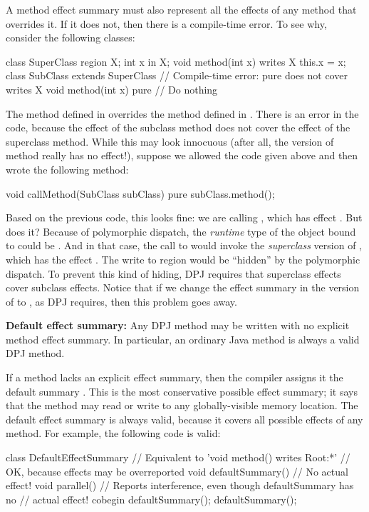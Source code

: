 A method effect summary must also represent all the effects of any
method that overrides it.  If it does not, then there is a
compile-time error.  To see why, consider the following classes:
%
\begin{dpjlisting}
class SuperClass {
  region X;
  int x in X;
  void method(int x) writes X {
    this.x = x;
  }
}
class SubClass extends SuperClass {
  // Compile-time error:  pure does not cover writes X
  void method(int x) pure {
    // Do nothing
  }
}
\end{dpjlisting}
%
The method  defined in  overrides the method
 defined in .  There is an error in the
code, because the effect  of the subclass method does not
cover the effect  of the superclass method.  While this
may look innocuous (after all, the  version of method
really has no effect!), suppose we allowed the code given above and
then wrote the following method:
%
\begin{dpjlisting}
void callMethod(SubClass subClass) pure {
  subClass.method();
}
\end{dpjlisting}
%
Based on the previous code, this looks fine: we are calling
, which has effect .  But does it?
Because of polymorphic dispatch, the \emph{runtime} type of the object
bound to  could be .  And in that case,
the call to  would invoke the \emph{superclass} version of
, which has the effect .  The write to
region  would be ``hidden'' by the polymorphic dispatch.  To
prevent this kind of hiding, DPJ requires that superclass effects
cover subclass effects.  Notice that if we change the effect summary
in the  version of  to , as
DPJ requires, then this problem goes away.

\noindent
\textbf{Default effect summary:} Any DPJ method may be written with no
explicit method effect summary.  In particular, an ordinary Java
method is always a valid DPJ method.

If a method lacks an explicit effect summary, then the compiler
assigns it the default summary .  This is the most
conservative possible effect summary; it says that the method may read
or write to any globally-visible memory location.  The default effect
summary is always valid, because it covers all possible effects of any
method.  For example, the following code is valid:
%
\begin{dpjlisting}
class DefaultEffectSummary {
    // Equivalent to 'void method() writes Root:*'
    // OK, because effects may be overreported
    void defaultSummary() {
        // No actual effect!
    }
    void parallel() {
        // Reports interference, even though defaultSummary has no
        // actual effect!
        cobegin {
           defaultSummary();
           defaultSummary();
        }
    }
}
\end{dpjlisting}

